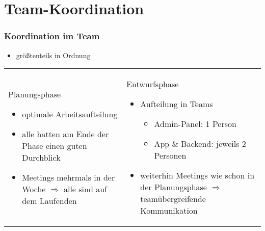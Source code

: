 \section{Team-Koordination}

\begin{frame}\frametitle{Koordination im Team}
    \begin{itemize}
        \item größtenteils in Ordnung
    \end{itemize}
        	\begin{tabular}{l l}
        	\begin{tcolorbox}[width=.4\textwidth]
        	Planungsphase
        	\begin{itemize}
        		\item optimale Arbeitsaufteilung
        		\item alle hatten am Ende der Phase einen guten Durchblick
        		\item Meetings mehrmals in der Woche $\Rightarrow$ alle sind auf dem Laufenden
        	\end{itemize}
        	\end{tcolorbox} &
        	\begin{tcolorbox}[width=.5\textwidth]
        	Entwurfsphase
        	\begin{itemize}
        		\item Aufteilung in Teams
        		\begin{itemize}
        			\item Admin-Panel: 1 Person
        			\item App \& Backend: jeweils 2 Personen
        		\end{itemize}
        	\item weiterhin Meetings wie schon in der Planungsphase $\Rightarrow$ teamübergreifende Kommunikation
     	\end{itemize}
        	\end{tcolorbox} \\
        	\end{tabular}
\end{frame}

